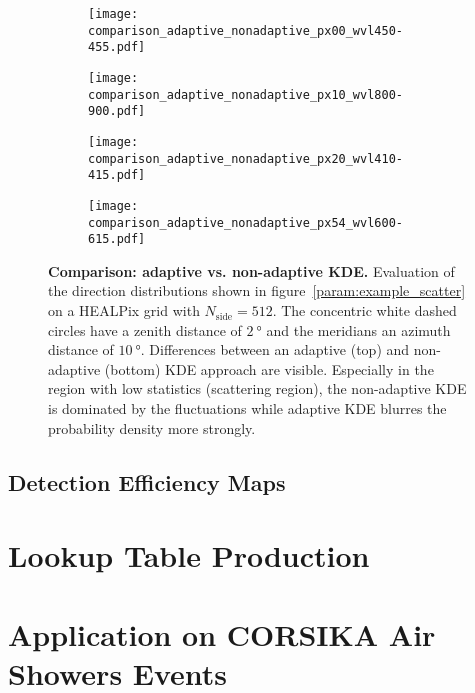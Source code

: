 \begin{figure}[H]
	\centering
	\begin{subfigure}[t]{0.41\textwidth}
		\texttt{[image: comparison\_adaptive\_nonadaptive\_px00\_wvl450-455.pdf]}
		\subcaption{}
		\label{param:kde_comparison:1}
	\end{subfigure}
	\hfill
	\begin{subfigure}[t]{0.41\textwidth}
		\texttt{[image: comparison\_adaptive\_nonadaptive\_px10\_wvl800-900.pdf]}
		\subcaption{}
		\label{param:kde_comparison:2}
	\end{subfigure}
	\vfill
	\begin{subfigure}[b]{0.41\textwidth}
		\texttt{[image: comparison\_adaptive\_nonadaptive\_px20\_wvl410-415.pdf]}
		\subcaption{}
		\label{param:kde_comparison:3}
	\end{subfigure}
	\hfill
	\begin{subfigure}[b]{0.41\textwidth}
		\texttt{[image: comparison\_adaptive\_nonadaptive\_px54\_wvl600-615.pdf]}
		\subcaption{}
		\label{param:kde_comparison:4}
	\end{subfigure}
	\caption[Comparison: adaptive vs. non-adaptive KDE]{\textbf{Comparison: adaptive vs. non-adaptive KDE.} Evaluation of the direction distributions shown in figure~\ref{param:example_scatter} on a HEALPix grid with $N_\text{side}=\num{512}$. The concentric white dashed circles have a zenith distance of $\SI{2}{\degree}$ and the meridians an azimuth distance of $\SI{10}{\degree}$. Differences between an adaptive (top) and non-adaptive (bottom) KDE approach are visible. Especially in the region with low statistics (scattering region), the non-adaptive KDE is dominated by the fluctuations while adaptive KDE blurres the probability density more strongly.}
	\label{param:kde_comparison}		
\end{figure}


\subsection{Detection Efficiency Maps}\label{sec:deteff_maps}

\section{Lookup Table Production}

\section{Application on CORSIKA Air Showers Events}
